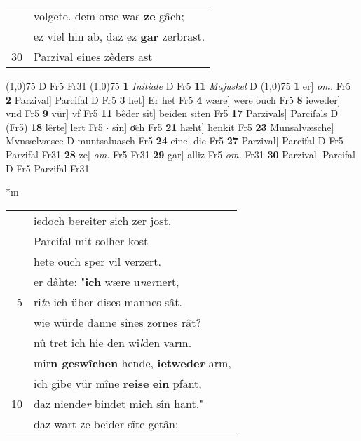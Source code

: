 \documentclass[8pt,a4paper,notitlepage]{article}
\begin{document}
\begin{table}[ht]
\begin{minipage}[t]{0.5\linewidth}
\begin{tabular}{rl}
 & volgete. dem orse was \textbf{ze} gâch;\\ 
 & ez viel hin ab, daz ez \textbf{gar} zerbrast.\\ 
30 & Parzival eines zêders ast\\ 
\end{tabular}
\scriptsize
\line(1,0){75} \newline
D Fr5 Fr31 \newline
\line(1,0){75} \newline
\textbf{1} \textit{Initiale} D Fr5  \textbf{11} \textit{Majuskel} D  \newline
\line(1,0){75} \newline
\textbf{1} er] \textit{om.} Fr5 \textbf{2} Parzival] Parcifal D Fr5 \textbf{3} het] Er het Fr5 \textbf{4} wære] were ouch Fr5 \textbf{8} ieweder] vnd Fr5 \textbf{9} vür] vf Fr5 \textbf{11} bêder sît] beiden siten Fr5 \textbf{17} Parzivals] Parcifals D (Fr5) \textbf{18} lêrte] lert Fr5  $\cdot$ sîn] oͮch Fr5 \textbf{21} hæht] henkit Fr5 \textbf{23} Munsalvæsche] Mvnsælvæsce D muntsaluasch Fr5 \textbf{24} eine] die Fr5 \textbf{27} Parzival] Parcifal D Fr5 Parzifal Fr31 \textbf{28} ze] \textit{om.} Fr5 Fr31 \textbf{29} gar] alliz Fr5 \textit{om.} Fr31 \textbf{30} Parzival] Parcifal D Fr5 Parzifal Fr31 \newline
\end{minipage}
\hspace{0.5cm}
\begin{minipage}[t]{0.5\linewidth}
\small
\begin{center}*m
\end{center}
\begin{tabular}{rl}
 & iedoch bereiter sich zer jost.\\ 
 & Parcifal mit solher kost\\ 
 & hete ouch sper vil verzert.\\ 
 & er dâhte: "\textbf{ich} wære u\textit{n}e\textit{r}nert,\\ 
5 & ri\textit{t}e ich über dises mannes sât.\\ 
 & wie würde danne sînes zornes rât?\\ 
 & nû tret ich hie den wi\textit{l}den varm.\\ 
 & mir\textbf{n geswîchen} hende, \textbf{ietwede\textit{r}} arm,\\ 
 & ich gibe vür mîne \textbf{reise} \textbf{ein} pfant,\\ 
10 & daz niende\textit{r} bindet mich sîn hant."\\ 
 & daz wart ze beider sîte getân:\\ 

\end{tabular}
\end{minipage}
\end{table}
\end{document}
